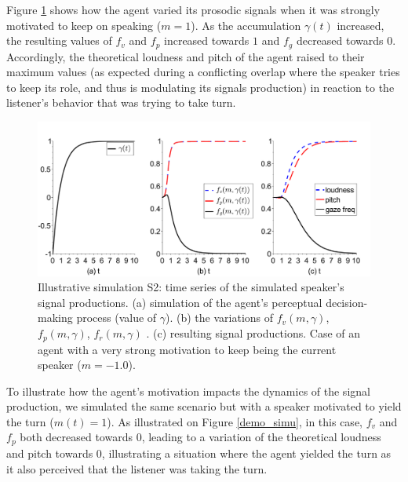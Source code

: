 Figure \ref{demo_simu_l1} shows how the agent varied its prosodic signals when it was strongly motivated to keep on speaking ($m=1$).
As the accumulation $\gamma(t)$ increased, the resulting values of $f_v$ and $f_p$ increased towards $1$ and $f_g$ decreased towards $0$. 
Accordingly, the theoretical loudness and pitch of the agent raised to their maximum values (as expected during a conflicting overlap where the speaker tries to keep its role, and thus is modulating its signals production) in reaction to the listener's behavior that was trying to take turn. 


\begin{figure}
  \centering
  \includegraphics[width=\linewidth]{figure/signals_simu_s2a.pdf}
  \caption{Illustrative simulation S2: time series of the simulated speaker's signal productions. (a) simulation of the agent's perceptual decision-making process (value of $\gamma$). (b) the variations of $f_v(m,\gamma)$, $f_p(m,\gamma)$, $f_r(m,\gamma)$ . (c) resulting  signal productions. Case of an agent with a very strong motivation to keep being the current speaker ($m=-1.0$).}
  \label{demo_simu_l1}
\end{figure}

To illustrate how the agent's motivation impacts the dynamics of the signal production, we simulated the same scenario but with a speaker motivated to yield the turn ($m(t)=1$). As illustrated on Figure \ref{demo_simu}, in this case, $f_v$ and $f_p$ both decreased towards $0$, leading to a variation of the theoretical loudness and pitch towards $0$, illustrating a situation where the agent yielded the turn as it also perceived that the listener was taking the turn. 

